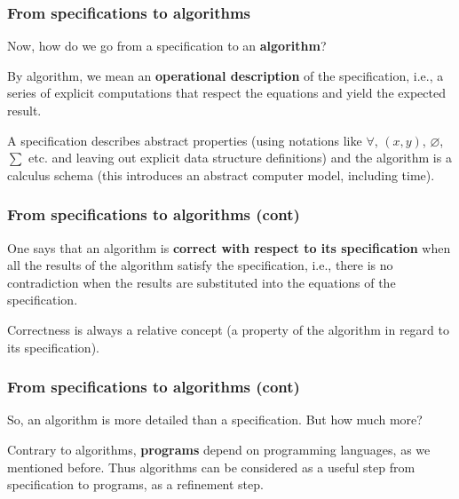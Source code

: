
%
\begin{frame}
\frametitle{From specifications to algorithms}

Now, how do we go from a specification to an \textbf{algorithm}? 

\bigskip

By algorithm, we mean an \textbf{operational description} of the
specification, i.e., a series of explicit computations that respect the
equations and yield the expected result.

\bigskip

A specification describes abstract properties (using notations like
\(\forall\), \((x,y)\), \(\varnothing\), \(\sum\) etc. and leaving out
explicit data structure definitions) and the algorithm is a calculus
schema (this introduces an abstract computer model, including time).

\end{frame}

%
\begin{frame}
\frametitle{From specifications to algorithms (cont)}

One says that an algorithm is \textbf{correct with respect to its
specification} when all the results of the algorithm satisfy the
specification, i.e., there is no contradiction when the results are
substituted into the equations of the specification.

\bigskip

Correctness is always a relative concept (a property of the algorithm
in regard to its specification).

\end{frame}

%
\begin{frame}
\frametitle{From specifications to algorithms (cont)}

So, an algorithm is more detailed than a specification. But how much
more?

\bigskip

Contrary to algorithms, \textbf{programs} depend on programming
languages, as we mentioned before. Thus algorithms can be considered
as a useful step from specification to programs, as a refinement
step.

\end{frame}

